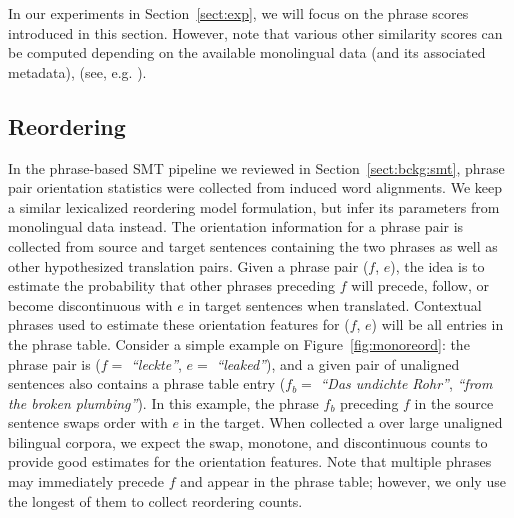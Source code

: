 \documentclass[11pt]{article}
\newcommand{\mnote}[1]{\marginpar{%
  \vskip-\baselineskip
  \raggedright\footnotesize
  \itshape\hrule\smallskip\tiny{#1}\par\smallskip\hrule}}
\newcommand{\mtodo}[1]{\mnote{\textcolor{red}{#1}}}
\newcommand{\secref}[1]{Section~\ref{#1}}
\newcommand{\figref}[1]{Figure~\ref{#1}}
\newcommand{\emq}[1]{\emph{``#1''}}
\begin{document}
In our experiments in \secref{sect:exp}, we will focus on the phrase scores introduced in this section.  However, note that various other similarity scores can be computed depending on the available monolingual data (and its associated metadata), (see, e.g. \cite{Schafer:2002}).

\subsection{Reordering} \label{sect:order}

In the phrase-based SMT pipeline we reviewed in \secref{sect:bckg:smt}, phrase pair orientation statistics were collected from induced word alignments.  We keep a similar lexicalized reordering model formulation, but infer its parameters from monolingual data instead.  The orientation information for a phrase pair is collected from source and target sentences containing the two phrases as well as other hypothesized translation pairs.  Given a phrase pair ($f$, $e$), the idea is to estimate the probability that other phrases preceding $f$ will precede, follow, or become discontinuous with $e$ in target sentences when translated.  Contextual phrases used to estimate these orientation features for ($f$, $e$) will be all entries in the phrase table.  Consider a simple example on \figref{fig:monoreord}: the phrase pair is ($f =$ \emq{leckte}, $e =$ \emq{leaked}), and a given pair of unaligned sentences also contains a phrase table entry ($f_{b} =$ \emq{Das undichte Rohr}, \emq{from the broken plumbing}).  In this example, the phrase $f_{b}$ preceding $f$ in the source sentence swaps order with $e$ in the target.  When collected a over large unaligned bilingual corpora, we expect the swap, monotone, and discontinuous counts to provide good estimates for the orientation features.  Note that multiple phrases may immediately precede $f$ and appear in the phrase table; however, we only use the longest of them to collect reordering counts.\mtodo{Explain why?}
\end{document}
